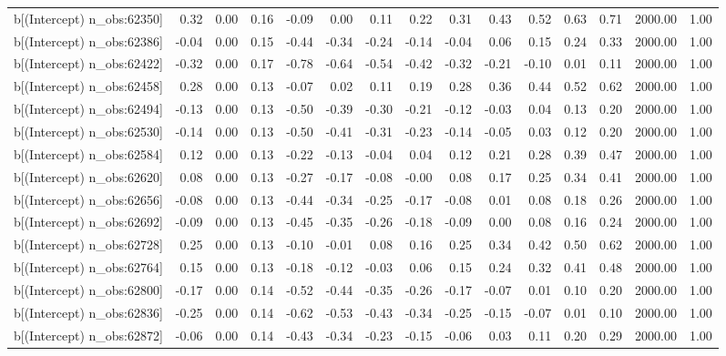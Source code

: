 \begin{table}[ht]
\begin{tabular}{rrrrrrrrrrrrrrr}
  b[(Intercept) n\_obs:62350] & 0.32 & 0.00 & 0.16 & -0.09 & 0.00 & 0.11 & 0.22 & 0.31 & 0.43 & 0.52 & 0.63 & 0.71 & 2000.00 & 1.00 \\ 
  b[(Intercept) n\_obs:62386] & -0.04 & 0.00 & 0.15 & -0.44 & -0.34 & -0.24 & -0.14 & -0.04 & 0.06 & 0.15 & 0.24 & 0.33 & 2000.00 & 1.00 \\ 
  b[(Intercept) n\_obs:62422] & -0.32 & 0.00 & 0.17 & -0.78 & -0.64 & -0.54 & -0.42 & -0.32 & -0.21 & -0.10 & 0.01 & 0.11 & 2000.00 & 1.00 \\ 
  b[(Intercept) n\_obs:62458] & 0.28 & 0.00 & 0.13 & -0.07 & 0.02 & 0.11 & 0.19 & 0.28 & 0.36 & 0.44 & 0.52 & 0.62 & 2000.00 & 1.00 \\ 
  b[(Intercept) n\_obs:62494] & -0.13 & 0.00 & 0.13 & -0.50 & -0.39 & -0.30 & -0.21 & -0.12 & -0.03 & 0.04 & 0.13 & 0.20 & 2000.00 & 1.00 \\ 
  b[(Intercept) n\_obs:62530] & -0.14 & 0.00 & 0.13 & -0.50 & -0.41 & -0.31 & -0.23 & -0.14 & -0.05 & 0.03 & 0.12 & 0.20 & 2000.00 & 1.00 \\ 
  b[(Intercept) n\_obs:62584] & 0.12 & 0.00 & 0.13 & -0.22 & -0.13 & -0.04 & 0.04 & 0.12 & 0.21 & 0.28 & 0.39 & 0.47 & 2000.00 & 1.00 \\ 
  b[(Intercept) n\_obs:62620] & 0.08 & 0.00 & 0.13 & -0.27 & -0.17 & -0.08 & -0.00 & 0.08 & 0.17 & 0.25 & 0.34 & 0.41 & 2000.00 & 1.00 \\ 
  b[(Intercept) n\_obs:62656] & -0.08 & 0.00 & 0.13 & -0.44 & -0.34 & -0.25 & -0.17 & -0.08 & 0.01 & 0.08 & 0.18 & 0.26 & 2000.00 & 1.00 \\ 
  b[(Intercept) n\_obs:62692] & -0.09 & 0.00 & 0.13 & -0.45 & -0.35 & -0.26 & -0.18 & -0.09 & 0.00 & 0.08 & 0.16 & 0.24 & 2000.00 & 1.00 \\ 
  b[(Intercept) n\_obs:62728] & 0.25 & 0.00 & 0.13 & -0.10 & -0.01 & 0.08 & 0.16 & 0.25 & 0.34 & 0.42 & 0.50 & 0.62 & 2000.00 & 1.00 \\ 
  b[(Intercept) n\_obs:62764] & 0.15 & 0.00 & 0.13 & -0.18 & -0.12 & -0.03 & 0.06 & 0.15 & 0.24 & 0.32 & 0.41 & 0.48 & 2000.00 & 1.00 \\ 
  b[(Intercept) n\_obs:62800] & -0.17 & 0.00 & 0.14 & -0.52 & -0.44 & -0.35 & -0.26 & -0.17 & -0.07 & 0.01 & 0.10 & 0.20 & 2000.00 & 1.00 \\ 
  b[(Intercept) n\_obs:62836] & -0.25 & 0.00 & 0.14 & -0.62 & -0.53 & -0.43 & -0.34 & -0.25 & -0.15 & -0.07 & 0.01 & 0.10 & 2000.00 & 1.00 \\ 
  b[(Intercept) n\_obs:62872] & -0.06 & 0.00 & 0.14 & -0.43 & -0.34 & -0.23 & -0.15 & -0.06 & 0.03 & 0.11 & 0.20 & 0.29 & 2000.00 & 1.00 \\ 

\end{tabular}
\end{table}
